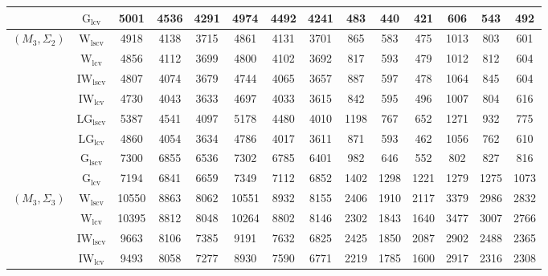 \begin{table}[!ht]
{\begin{tabular}{@{}cc|ccc|ccc|ccc|ccc@{}}
 & $\mathrm{G}_{\mathrm{lcv}}$ & 5001 & 4536 & 4291 & 4974 & 4492 & 4241 & 483 & 440 & 421 & 606 & 543 & 492 \\ 
\midrule
$(M_3,\Sigma_2)$ & $\mathrm{W}_{\mathrm{lscv}}$ & 4918 & 4138 & 3715 & 4861 & 4131 & 3701 & 865 & \cellcolor{black!30}583 & \cellcolor{black!10}475 & 1013 & \cellcolor{black!10}803 & \cellcolor{black!30}601 \\ 
 & $\mathrm{W}_{\mathrm{lcv}}$ & 4856 & 4112 & 3699 & 4800 & 4102 & 3692 & \cellcolor{black!30}817 & 593 & 479 & 1012 & 812 & \cellcolor{black!10}604 \\ 
 & $\mathrm{IW}_{\mathrm{lscv}}$ & \cellcolor{black!10}4807 & 4074 & 3679 & \cellcolor{black!10}4744 & 4065 & 3657 & 887 & 597 & 478 & 1064 & 845 & 604 \\ 
 & $\mathrm{IW}_{\mathrm{lcv}}$ & \cellcolor{black!30}4730 & \cellcolor{black!30}4043 & \cellcolor{black!30}3633 & \cellcolor{black!30}4697 & \cellcolor{black!10}4033 & \cellcolor{black!10}3615 & \cellcolor{black!10}842 & 595 & 496 & \cellcolor{black!10}1007 & 804 & 616 \\ 
 & $\mathrm{LG}_{\mathrm{lscv}}$ & 5387 & 4541 & 4097 & 5178 & 4480 & 4010 & 1198 & 767 & 652 & 1271 & 932 & 775 \\ 
 & $\mathrm{LG}_{\mathrm{lcv}}$ & 4860 & \cellcolor{black!10}4054 & \cellcolor{black!10}3634 & 4786 & \cellcolor{black!30}4017 & \cellcolor{black!30}3611 & 871 & \cellcolor{black!10}593 & \cellcolor{black!30}462 & 1056 & \cellcolor{black!30}762 & 610 \\ 
 & $\mathrm{G}_{\mathrm{lscv}}$ & 7300 & 6855 & 6536 & 7302 & 6785 & 6401 & 982 & 646 & 552 & \cellcolor{black!30}802 & 827 & 816 \\ 
 & $\mathrm{G}_{\mathrm{lcv}}$ & 7194 & 6841 & 6659 & 7349 & 7112 & 6852 & 1402 & 1298 & 1221 & 1279 & 1275 & 1073 \\ 
\midrule
$(M_3,\Sigma_3)$ & $\mathrm{W}_{\mathrm{lscv}}$ & 10550 & 8863 & 8062 & 10551 & 8932 & 8155 & 2406 & 1910 & 2117 & 3379 & 2986 & 2832 \\ 
 & $\mathrm{W}_{\mathrm{lcv}}$ & 10395 & 8812 & 8048 & 10264 & 8802 & 8146 & \cellcolor{black!10}2302 & \cellcolor{black!10}1843 & \cellcolor{black!10}1640 & 3477 & 3007 & 2766 \\ 
 & $\mathrm{IW}_{\mathrm{lscv}}$ & \cellcolor{black!10}9663 & \cellcolor{black!10}8106 & \cellcolor{black!10}7385 & \cellcolor{black!10}9191 & \cellcolor{black!10}7632 & \cellcolor{black!10}6825 & 2425 & 1850 & 2087 & 2902 & 2488 & 2365 \\ 
 & $\mathrm{IW}_{\mathrm{lcv}}$ & \cellcolor{black!30}9493 & \cellcolor{black!30}8058 & \cellcolor{black!30}7277 & \cellcolor{black!30}8930 & \cellcolor{black!30}7590 & \cellcolor{black!30}6771 & \cellcolor{black!30}2219 & \cellcolor{black!30}1785 & \cellcolor{black!30}1600 & 2917 & 2316 & 2308 \\ 

\end{tabular}}
\end{table}
